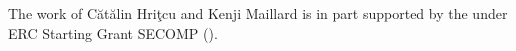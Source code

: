 \documentclass[sigplan,screen]{acmart}\settopmatter{}
\newcommand*{\EG}{e.g.,\xspace}
\begin{document}



\begin{acks}                            %

The work of C\u{a}t\u{a}lin Hri\c{t}cu and Kenji Maillard is
in part supported by the
under ERC Starting Grant SECOMP ().
\end{acks}

%  

\ifcamera
\balance
\clearpage

\else

\fi

\end{document}
